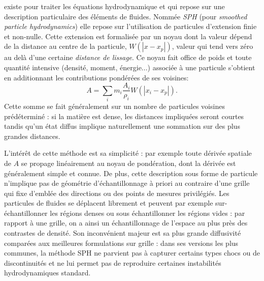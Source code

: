  existe pour traiter les équations hydrodynamique et qui repose sur une description particulaire des éléments de fluides. Nommée \textit{SPH} (pour \textit{smoothed particle hydrodynamics}) elle repose sur l'utilisation de particules d'extension finie et non-nulle. Cette extension est formalisée par un noyau dont la valeur dépend de la distance au centre de la particule, $W(|x-x_p|)$, valeur qui tend vers zéro au delà d'une certaine \textit{distance de lissage}. Ce noyau fait office de poids et toute quantité intensive (densité, moment, énergie...) associée à une particule s'obtient en additionnant les contributions pondérées de ses voisines:
\begin{equation}
A=\sum_i m_i \frac{A_i}{\rho_i} W(|x_i-x_p|).
\end{equation} 
Cette somme se fait généralement sur un nombre de particules voisines prédéterminé : si la matière est dense, les distances impliquées seront courtes tandis qu'un état diffus implique naturellement une sommation sur des plus grandes distances.
 
L'intérêt de cette méthode est sa simplicité : par exemple toute dérivée spatiale de $A$ se propage linéairement au noyau de pondération, dont la dérivée est généralement simple et connue. De plus, cette description sous forme de particule n'implique pas de géométrie d'échantillonnage à priori au contraire d'une grille qui fixe d'emblée des directions ou des points de mesures privilégiés. Les particules de fluides se déplacent librement et peuvent par exemple sur-échantillonner les régions denses ou sous échantillonner les régions vides : par rapport à une grille, on a ainsi un échantillonnage de l'espace au plus près des contrastes de densité. Son inconvénient majeur est sa plus grande diffusivité comparées aux meilleures formulations sur grille : dans ses versions les plus communes, la méthode SPH ne parvient pas à capturer certains types chocs ou de discontinuités et ne lui permet pas de reproduire certaines instabilités hydrodynamiques standard. 


